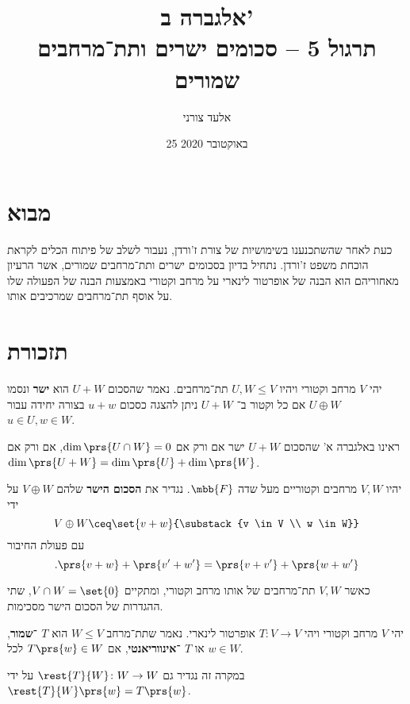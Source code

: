 \documentclass[article, 10pt,oneside]{article}
\title{
אלגברה ב' \\ תרגול 5 -- סכומים ישרים ותת־מרחבים שמורים
}
\author{אלעד צורני}
\date{
25 באוקטובר 2020
}
\renewcommand{\emph}[1]{\textbf{#1}}
\begin{document}
\maketitle

\section*{מבוא}

כעת לאחר שהשתכנענו בשימושיות של צורת ז'ורדן, נעבור לשלב של פיתוח הכלים לקראת הוכחת משפט ז'ורדן. נתחיל בדיון בסכומים ישרים ותת־מרחבים שמורים, אשר הרעיון מאחוריהם הוא הבנה של אופרטור לינארי על מרחב וקטורי באמצעות הבנה של הפעולה שלו על אוסף תת־מרחבים שמרכיבים אותו.

\section*{תזכורת}

\begin{definition}
יהי
$V$
מרחב וקטורי ויהיו
$U,W \leq V$
תת־מרחבים.
נאמר שהסכום
$U + W$
הוא
\emph{ישר}
ונסמו
$U \oplus W$
אם כל וקטור ב־%
$U+W$
ניתן להצגה כסכום
$u + w$
בצורה יחידה עבור
$u \in U, w \in W$.
\end{definition}

\begin{remark}
ראינו באלגברה א' שהסכום
$U + W$
ישר אם ורק אם
$\dim\prs{U \cap W} = 0$,
אם ורק אם
$\dim\prs{U+W} = \dim\prs{U} + \dim\prs{W}$.
\end{remark}

\begin{definition}
יהיו
$V,W$
מרחבים וקטוריים מעל שדה
$\mbb{F}$.
נגדיר את
\emph{הסכום הישר}
שלהם
$V \oplus W$
על ידי
\[V \oplus W \ceq \set{v+w}{\substack{v \in V \\ w \in W}}\]
עם פעולת החיבור
\[\text{.} \prs{v+w} + \prs{v'+w'} = \prs{v+v'} + \prs{w+w'}\]
\end{definition}

\begin{remark}
כאשר
$V,W$
תת־מרחבים של אותו מרחב וקטורי, ומתקיים
$V \cap W = \set{0}$,
שתי ההגדרות של הסכום הישר מסכימות.
\end{remark}

\begin{definition}
יהי
$V$
מרחב וקטורי ויהי
$T \colon V \to V$
אופרטור לינארי. נאמר שתת־מרחב
$W \leq V$
הוא
\emph{$T$%
־שמור}, או
\emph{$T$%
־אינווריאנטי}, אם
$T\prs{w} \in W$
לכל
$w \in W$.

במקרה זה נגדיר גם
$\rest{T}{W} \colon W \to W$
על ידי
$\rest{T}{W}\prs{w} = T\prs{w}$.
\end{definition}
\end{document}
